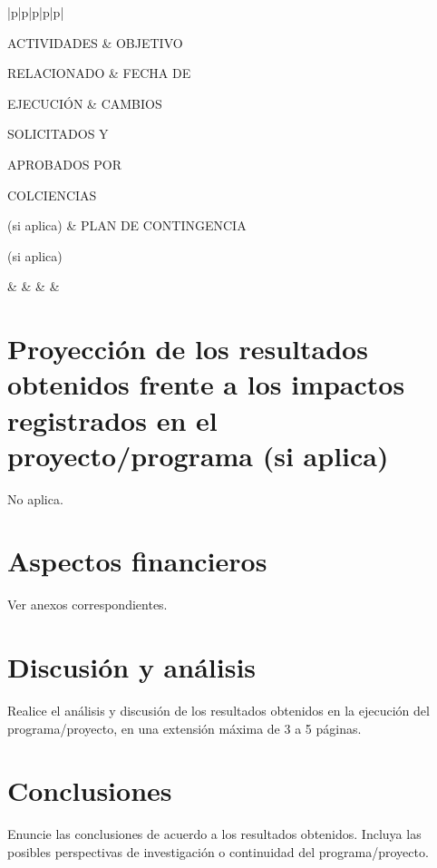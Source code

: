 \begin{landscape}
\newcommand{\Cronograma}[5]{
\gdef\actividad{#1}
\gdef\objetivo{#2}
\gdef\fecha{#3}
\gdef\cambios{#4}
\gdef\plan{#5}
\actividad & \objetivo &\fecha  & \cambios & \plan  \\ \hline
}

\hspace{-1.4cm}\begin{longtable}{|p{\ic\textwidth}|p{\iic\textwidth}|p{\iiic\textwidth}|p{\ivc\textwidth}|p{\vc\textwidth}|}
 \hline
\Cronograma%
{%
\centering ACTIVIDADES
}%
{%
\centering OBJETIVO\par RELACIONADO
}%
{%
\centering FECHA DE\par EJECUCIÓN
}%
{%
\centering CAMBIOS \par SOLICITADOS Y \par APROBADOS POR \par COLCIENCIAS \par (si aplica)
}%
{%
PLAN DE CONTINGENCIA \par 
(si aplica)
}
%
\Cronograma%
{%
}%
{%
}%
{%
}%
{%
}%
{%
}
%
\end{longtable}



\end{landscape}

\pagestyle{fancy}
\section{Proyección de los resultados obtenidos frente a los impactos registrados en el proyecto/programa (si
aplica)}
No aplica.
\section{Aspectos financieros  }
Ver anexos correspondientes.
\section{Discusión y análisis  }
\begin{instrucciones}
  Realice el análisis y discusión de los resultados obtenidos en la ejecución del programa/proyecto, en una extensión máxima de 3 a 5 páginas.
\end{instrucciones}

\section{Conclusiones          }
\begin{instrucciones}
  Enuncie las conclusiones de acuerdo a los resultados obtenidos. Incluya las posibles perspectivas de investigación o continuidad del programa/proyecto.
\end{instrucciones}


